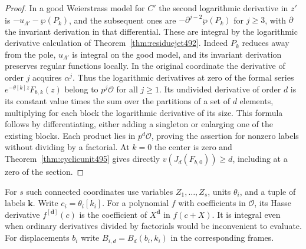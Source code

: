 \documentclass[a4paper,11pt]{article}
\theoremstyle{definition}
\theoremstyle{remark}
\numberwithin{equation}{section}
\begin{document}
\begin{proof}
In a good Weierstrass model for \(C'\) the second logarithmic
derivative in \(z'\) is \(-u_{\Lambda'}-\wp(P_k)\), and the subsequent
ones are \(-\partial^{j-2}\wp(P_k)\) for \(j\ge3\), with \(\partial\)
the invariant derivation in that differential. These are integral
by the logarithmic derivative calculation of
Theorem~\ref{thm:residuejet492}. Indeed \(P_k\) reduces away
from the pole, \(u_{\Lambda'}\) is integral on the good model,
and its invariant derivation preserves regular functions locally.
In the original coordinate the derivative of order \(j\) acquires
\(\alpha^j\). Thus the logarithmic derivatives at zero of the formal
series \(e^{-\theta[k]z}F_{b,k}(z)\) belong to \(p^j\mathcal O\)
for all \(j\ge1\). Its undivided derivative of order \(d\) is its
constant value times the sum over the partitions of a set of
\(d\) elements, multiplying for each block the logarithmic
derivative of its size. This formula follows by differentiating,
either adding a singleton or enlarging one of the existing blocks.
Each product lies in \(p^d\mathcal O\), proving the assertion for
nonzero labels without dividing by a factorial. At \(k=0\) the
center is zero and Theorem~\ref{thm:cyclicunit495} gives directly
\(v(J_d(F_{b,0}))\ge d\), including at a zero of the section.
\end{proof}

For \(s\) such connected coordinates use variables
\(Z_1,\ldots,Z_s\), units \(\theta_i\), and a tuple of labels
\(\mathbf k\). Write \(c_i=\theta_i[k_i]\).
For a polynomial \(f\) with coefficients in \(\mathcal O\), its
Hasse derivative \(f^{[\mathbf d]}(c)\) is the coefficient of
\(X^{\mathbf d}\) in \(f(c+X)\). It is integral even when ordinary
derivatives divided by factorials would be inconvenient to evaluate.
For displacements \(b_i\) write \(B_{i,d}=B_d(b_i,k_i)\) in the
corresponding frames.
\end{document}
